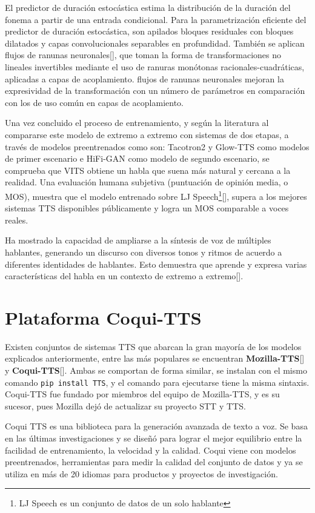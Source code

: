 El predictor de duración estocástica estima la distribución de la duración del fonema a partir de una entrada condicional. Para la parametrización eficiente del predictor de duración estocástica, son apilados bloques residuales con bloques dilatados y capas convolucionales separables en profundidad. También se aplican flujos de ranunas neuronales[\cite{durkan2019neural}], que toman la forma de transformaciones no lineales invertibles mediante el uso de ranuras monótonas racionales-cuadráticas, aplicadas a capas de acoplamiento. flujos de ranunas neuronales mejoran la expresividad de la transformación con un número de parámetros en comparación con los de uso común en capas de acoplamiento. 

Una vez concluido el proceso de entrenamiento, y según la literatura al compararse este modelo de extremo a extremo con sistemas de dos etapas, a través de modelos preentrenados como son: Tacotron2 y Glow-TTS como modelos de primer escenario e HiFi-GAN como modelo de segundo escenario, se comprueba que VITS obtiene un habla que suena más natural y cercana a la realidad. Una evaluación humana subjetiva (puntuación de opinión media, o MOS), muestra que el modelo entrenado sobre LJ Speech\footnote{LJ Speech es un conjunto de datos de un solo hablante}[\cite{ljspeech}], supera a los mejores sistemas TTS disponibles públicamente y logra un MOS comparable a voces reales.

Ha mostrado la capacidad de ampliarse a la síntesis de voz de múltiples hablantes, generando un discurso con diversos tonos y ritmos de acuerdo a diferentes identidades de hablantes. Esto demuestra que aprende y expresa varias características del habla en un contexto de extremo a extremo[\cite{kim2021conditional}].\\

\section{Plataforma Coqui-TTS}
Existen conjuntos de sistemas TTS que abarcan la gran mayoría de los modelos explicados anteriormente, entre las más populares se encuentran \textbf{Mozilla-TTS}[\cite{mozilla-doc}] y \textbf{Coqui-TTS}[\cite{coqui-doc}]. Ambas se comportan de forma similar, se instalan con el mismo comando \texttt{pip install TTS}, y el comando para ejecutarse tiene la misma sintaxis. Coqui-TTS fue fundado por miembros del equipo de Mozilla-TTS, y es su sucesor, pues Mozilla dejó de actualizar su proyecto STT y TTS.

Coqui TTS es una biblioteca para la generación avanzada de texto a voz. Se basa en las últimas investigaciones y se diseñó para lograr el mejor equilibrio entre la facilidad de entrenamiento, la velocidad y la calidad. Coqui viene con modelos preentrenados, herramientas para medir la calidad del conjunto de datos y ya se utiliza en más de 20 idiomas para productos y proyectos de investigación.

